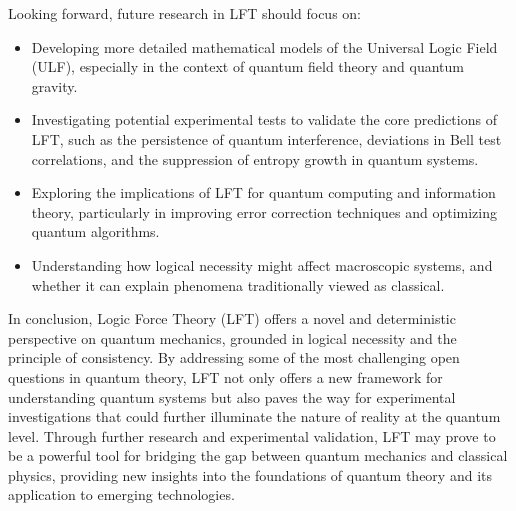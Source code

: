 Looking forward, future research in LFT should focus on:
\begin{itemize}
    \item Developing more detailed mathematical models of the Universal Logic Field (ULF), especially in the context of quantum field theory and quantum gravity.
    \item Investigating potential experimental tests to validate the core predictions of LFT, such as the persistence of quantum interference, deviations in Bell test correlations, and the suppression of entropy growth in quantum systems.
    \item Exploring the implications of LFT for quantum computing and information theory, particularly in improving error correction techniques and optimizing quantum algorithms.
    \item Understanding how logical necessity might affect macroscopic systems, and whether it can explain phenomena traditionally viewed as classical.
\end{itemize}

In conclusion, Logic Force Theory (LFT) offers a novel and deterministic perspective on quantum mechanics, grounded in logical necessity and the principle of consistency. By addressing some of the most challenging open questions in quantum theory, LFT not only offers a new framework for understanding quantum systems but also paves the way for experimental investigations that could further illuminate the nature of reality at the quantum level. Through further research and experimental validation, LFT may prove to be a powerful tool for bridging the gap between quantum mechanics and classical physics, providing new insights into the foundations of quantum theory and its application to emerging technologies.